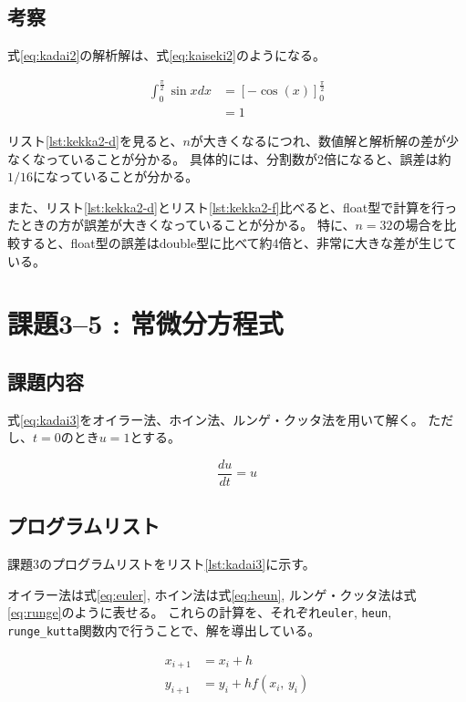 \documentclass[a4j,titlepage]{jsarticle}
\begin{document}
\subsection{考察}
式\ref{eq:kadai2}の解析解は、式\ref{eq:kaiseki2}のようになる。

\begin{align}
  \int_0^\frac{\pi}{2} \sin x dx &= \left[ -\cos(x) \right]_0^\frac{\pi}{2} \nonumber \\
  &= 1
  \label{eq:kaiseki2}
\end{align}

リスト\ref{lst:kekka2-d}を見ると、$n$が大きくなるにつれ、数値解と解析解の差が少なくなっていることが分かる。
具体的には、分割数が2倍になると、誤差は約$1/16$になっていることが分かる。

また、リスト\ref{lst:kekka2-d}とリスト\ref{lst:kekka2-f}比べると、float型で計算を行ったときの方が誤差が大きくなっていることが分かる。
特に、$n=32$の場合を比較すると、float型の誤差はdouble型に比べて約4倍と、非常に大きな差が生じている。


\section{課題3--5 : 常微分方程式}
\subsection{課題内容}
式\ref{eq:kadai3}をオイラー法、ホイン法、ルンゲ・クッタ法を用いて解く。
ただし、$t = 0$のとき$u = 1$とする。

\begin{equation}
  \frac{du}{dt} = u
  \label{eq:kadai3}
\end{equation}


\subsection{プログラムリスト}
課題3のプログラムリストをリスト\ref{lst:kadai3}に示す。

オイラー法は式\ref{eq:euler}, ホイン法は式\ref{eq:heun}, ルンゲ・クッタ法は式\ref{eq:runge}のように表せる。
これらの計算を、それぞれ\texttt{euler}, \texttt{heun}, \texttt{runge\_kutta}関数内で行うことで、解を導出している。

\begin{equation}
  \begin{aligned}
    x_{i+1} &= x_i + h \\
    y_{i+1} &= y_i + h f(x_i, \, y_i)
  \end{aligned}
  \label{eq:euler}
\end{equation}
\end{document}
